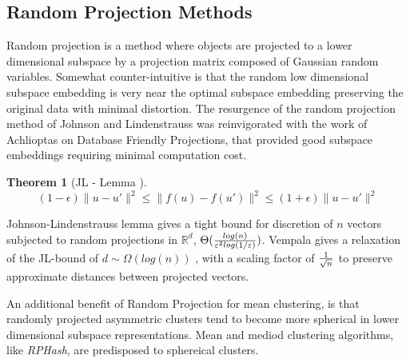 \documentclass[a4paper,10pt]{article}
\newtheorem{Theorem}{Theorem}[section]
\begin{document}
\subsection{Random Projection Methods} Random projection is a method where
objects are projected to a lower dimensional subspace by a projection
matrix composed of Gaussian random variables.  Somewhat counter-intuitive
is that the random low dimensional subspace embedding is very near the
optimal subspace embedding preserving the original data with minimal
distortion\cite{bourgain1985lipschitz}.  The resurgence of the random
projection method of Johnson and Lindenstrauss was reinvigorated with the
work of Achlioptas on Database Friendly Projections\cite{Achlioptas01},
that provided good subspace embeddings requiring minimal computation cost.
\begin{Theorem}[JL - Lemma \cite{vempala}]
 $$
(1-\epsilon) \|u-u'\|^2 \leq \|f(u)-f(u')\|^2 \leq (1+\epsilon) \| u-u' \|^2
$$
\end{Theorem}
Johnson-Lindenstrauss lemma gives a tight bound for discretion of $n$ vectors
subjected to random projections in $\mathbb{R}^d$, $\Theta( {{log(n)}\over
  {\varepsilon^2 log(1/\varepsilon) }})$.
Vempala gives a relaxation of the JL-bound of $d \sim \Omega(log(n))$
\cite{vempala}, with a scaling factor of ${{1}\over{\sqrt{n}}}$ to preserve
approximate distances between projected vectors.

An additional benefit of Random Projection for mean clustering, is that
randomly projected asymmetric clusters tend to become more spherical in lower
dimensional subspace representations\cite{bingham}.  Mean and mediod clustering
algorithms, like \emph{RPHash}, are predisposed to sphereical clusters.
\end{document}
